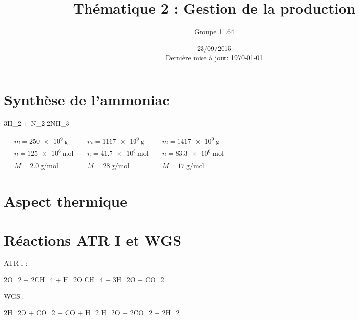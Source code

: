 \documentclass[a4paper,french]{article}
\title{Thématique 2 : Gestion de la production}
\author{Groupe 11.64}
\date{23/09/2015\\Dernière mise à jour: \today}
\begin{document}
	\maketitle	
	\section{Synthèse de l'ammoniac}
		\begin{chemmath}
			3H_2 + N_2 \longrightarrow 2NH_3	
		\end{chemmath}
		\begin{table}[h]
			\centering
			\renewcommand{\arraystretch}{2}
			\begin{tabular}{|cl|cl|cl|}\hline
				\chemform{3H_2} & $m = \SI{250e9}{\gram}$ & \chemform{N_2} & $m = \SI{1167e9}{\gram}$ & \chemform{2NH_3} & $m = \SI{1417e9}{\gram}$ \\
				& $n = \SI{125e6}{\mol}$ & & $n = \SI{41.7e6}{\mol}$ & & $n = \SI{83.3e6}{\mol}$ \\
				& $M = \SI{2.0}{\gram\per\mol}$ & & $M = \SI{28}{\gram\per\mol}$ & & $M = \SI{17}{\gram\per\mol}$ \\\hline
			\end{tabular}
		\end{table}
	\section{Aspect thermique}
	\section{Réactions ATR I et WGS}
		ATR I :
		\begin{chemmath}
			2O_2 + 2CH_4 + H_2O \longrightarrow CH_4 + 3H_2O + CO_2
		\end{chemmath}
		\indent WGS :
		\begin{chemmath}
			2H_2O + CO_2 + CO + H_2 \longrightarrow H_2O + 2CO_2 + 2H_2
		\end{chemmath}
\end{document}

